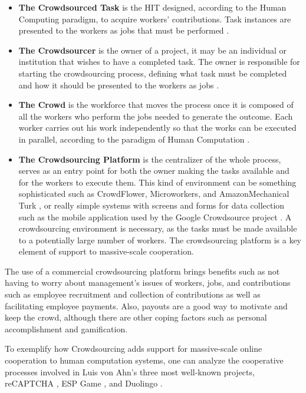 \begin{itemize}

\item{\textbf{The Crowdsourced Task}} is the HIT designed, according to the Human Computing paradigm, to acquire workers' contributions. Task instances are presented to the workers as jobs that must be performed \cite{Difallah:2015:DMC:2736277.2741685}.

\item{\textbf{The Crowdsourcer}} is the owner of a project, it may be an individual or institution that wishes to have a completed task. The owner is responsible for starting the crowdsourcing process, defining what task must be completed and how it should be presented to the workers as jobs \cite{6861072}.

\item{\textbf{The Crowd}} is the workforce that moves the process once it is composed of all the workers who perform the jobs needed to generate the outcome. Each worker carries out his work independently so that the works can be executed in parallel, according to the paradigm of Human Computation \cite{Rohwer:2010:NHC:1837885.1837897}.

\item{\textbf{The Crowdsourcing Platform}} is the centralizer of the whole process, serves as an entry point for both the owner making the tasks available and for the workers to execute them. This kind of environment can be something sophisticated such as CrowdFlower, Microworkers, and AmazonMechanical Turk \cite{Difallah:2015:DMC:2736277.2741685}, or really simple systems with screens and forms for data collection such as the mobile application used by the Google Crowdsource project \cite{google_cs}. A crowdsourcing environment is necessary, as the tasks must be made available to a potentially large number of workers. The crowdsourcing platform is a key element of support to massive-scale cooperation.

\end{itemize}

The use of a commercial crowdsourcing platform brings benefits such as not having to worry about management's issues of workers, jobs, and contributions such as employee recruitment and collection of contributions as well as facilitating employee payments. Also, payouts are a good way to motivate and keep the crowd, although there are other coping factors such as personal accomplishment and gamification.

To exemplify how Crowdsourcing adds support for massive-scale online cooperation to human computation systems, one can analyze the cooperative processes involved in Luis von Ahn's three most well-known projects,  reCAPTCHA \cite{Simmons:2010:PLV:1869086.1869102},  ESP Game \cite{Robertson:2009:REG:1520340.1520597}, and  Duolingo \cite{vonAhn:2011:THC}.

